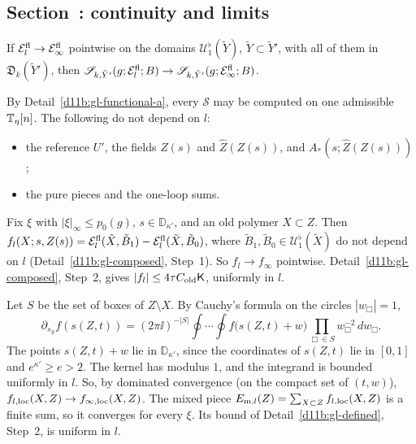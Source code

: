\subsection{Section~\texorpdfstring{}{59}: continuity and limits}\label{d11b:59d}

\begin{detail}\label{d11b:gl-continuity}
If $\mathcal E^{\rm fl}_l\to\mathcal E^{\rm fl}_\infty$ pointwise on the domains $\mathcal U^\flat_1(\tilde Y)$, $\tilde Y\subset\tilde Y'$, with all of them in $\mathfrak D_k(\tilde Y')$, then $\mathscr S_{k,\tilde Y'}(g;\mathcal E^{\rm fl}_l;B)\to\mathscr S_{k,\tilde Y'}(g;\mathcal E^{\rm fl}_\infty;B)$.
\end{detail}

\begin{step}
By Detail~\ref{d11b:gl-functional-a}, every $\mathscr S$ may be computed on one admissible $\mathbb T_\eta[n]$. The following do not depend on $l$:
\begin{itemize}
\item the reference $U'$, the fields $Z(s)$ and $\hat Z(Z(s))$, and $A_*(s;\hat Z(Z(s)))$;
\item the pure pieces and the one-loop sums.
\end{itemize}
\end{step}

\begin{step}
Fix $\xi$ with $|\xi|_\infty\le p_0(g)$, $s\in\mathbb D_{\kappa'}$, and an old polymer $X\subset Z$. Then $f_l(X;s,Z(s))=\mathcal E^{\rm fl}_l(\tilde X,\tilde B_1)-\mathcal E^{\rm fl}_l(\tilde X,\tilde B_0)$, where $\tilde B_1,\tilde B_0\in\mathcal U^\flat_1(\tilde X)$ do not depend on $l$ (Detail~\ref{d11b:gl-composed}, Step~1). So $f_l\to f_\infty$ pointwise. Detail~\ref{d11b:gl-composed}, Step~2, gives $|f_l|\le4\tau C_{\rm old}\mathsf K$, uniformly in $l$.

Let $S$ be the set of boxes of $Z\setminus X$. By Cauchy's formula on the circles $|w_\Box|=1$,
\[
\partial_{s_S}f(s(Z,t))=(2\pi\ii)^{-|S|}\oint\cdots\oint f\big(s(Z,t)+w\big)\prod_{\Box\in S}w_\Box^{-2}\,dw_\Box .
\]
The points $s(Z,t)+w$ lie in $\mathbb D_{\kappa'}$, since the coordinates of $s(Z,t)$ lie in $[0,1]$ and $e^{\kappa'}\ge e>2$. The kernel has modulus $1$, and the integrand is bounded uniformly in $l$. So, by dominated convergence (on the compact set of $(t,w)$), $f_{l,\rm loc}(X,Z)\to f_{\infty,\rm loc}(X,Z)$. The mixed piece $E_{{\rm m},l}(Z)=\sum_{X\subset Z}f_{l,\rm loc}(X,Z)$ is a finite sum, so it converges for every $\xi$. Its bound of Detail~\ref{d11b:gl-defined}, Step~2, is uniform in $l$.
\end{step}

